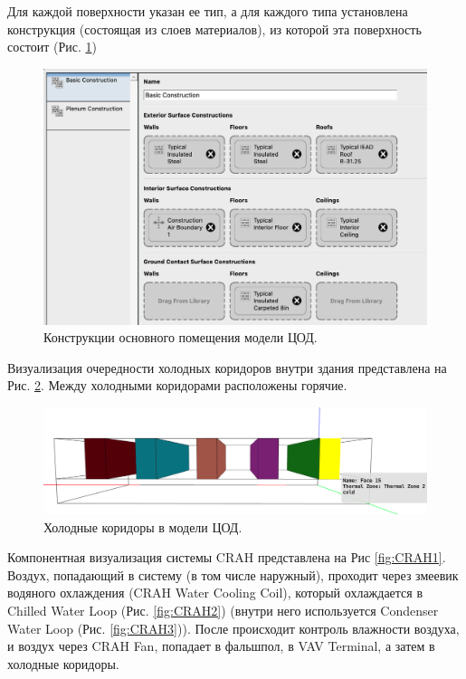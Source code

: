 \documentclass{article}
\begin{document}
Для каждой поверхности указан ее тип, а для каждого типа установлена конструкция (состоящая из слоев материалов), из которой эта поверхность состоит (Рис. \ref{fig:DC_constructions})

\begin{figure}[h!]
\centering
\includegraphics[width=0.8\linewidth]{figures/DC_constructions.png}
\caption{Конструкции основного помещения модели ЦОД.}
\label{fig:DC_constructions}
\end{figure}

Визуализация очередности холодных коридоров внутри здания представлена на Рис. \ref{fig:aisles_zones}. Между холодными коридорами расположены горячие. 

\begin{figure}[h!]
\centering
\includegraphics[width=0.95\linewidth]{figures/aisles_zones.png}
\caption{Холодные коридоры в модели ЦОД.}
\label{fig:aisles_zones}
\end{figure}

Компонентная визуализация системы CRAH представлена на Рис \ref{fig:CRAH1}. Воздух, попадающий в систему (в том числе наружный), проходит через змеевик водяного охлаждения (CRAH Water Cooling Coil), который охлаждается в Chilled Water Loop (Рис. \ref{fig:CRAH2}) (внутри него используется Condenser Water Loop (Рис. \ref{fig:CRAH3})). После происходит контроль влажности воздуха, и воздух через CRAH Fan, попадает в фальшпол, в VAV Terminal, а затем в холодные коридоры.
\end{document}
